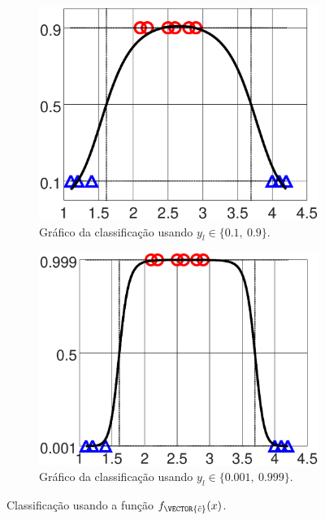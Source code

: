 \begin{figure}[!h]
    \begin{subfigure}[b]{0.45\textwidth}
        \centering
        \includegraphics[width=\textwidth]{chapters/classificacao/mfiles/reglogr1r1poly/ex1s1-reglogr1r1poly.eps}
        \caption{Gráfico da classificação usando $y_l \in \{0.1,~ 0.9\}$.}
        \label{fig:theo:reglogr1r1poly:xn:s1}
    \end{subfigure}
    \hfill
    \begin{subfigure}[b]{0.45\textwidth}
        \centering
        \includegraphics[width=\textwidth]{chapters/classificacao/mfiles/reglogr1r1poly/ex1s2-reglogr1r1poly.eps}
        \caption{Gráfico da classificação usando $y_l \in \{0.001,~ 0.999\}$.}
        \label{fig:theo:reglogr1r1poly:xn:s2}
    \end{subfigure}
    \caption{Classificação usando a função $f_{\VECTOR{\hat{c}}}(x)$.}
    \label{fig:theo:reglogr1r1poly:xn}
\end{figure}


